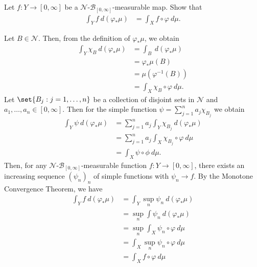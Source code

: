 \documentclass[10pt]{mypackage}
\begin{document}
\begin{problem}
  Let $f\colon Y\to [0,\infty]$ be a $\mathcal{N}$-$\mathcal{B}_{[0,\infty]}$-measurable map. Show that
  \begin{align*}
    \int_{Y}^{} f\:d\left( \varphi_{\ast}\mu \right) &= \int_{X}^{} f\circ\varphi\:d\mu.
  \end{align*}
\end{problem}
\begin{solution}
  Let $B\in \mathcal{N}$. Then, from the definition of $\varphi_{\ast}\mu$, we obtain  
  \begin{align*}
    \int_Y\chi_B\:d\left(\varphi_{\ast}\mu\right)&=\int_B\:d\left(\varphi_{\ast}\mu\right)\\
                                      &=\varphi_{\ast}\mu(B)\\
                                      &=\mu\left(\varphi^{-1}(B)\right)\\
                                      &=\int_X\chi_B\circ\varphi\:d\mu.
  \end{align*}
  Let $\set{B_j : j=1,\dots,n}$ be a collection of disjoint sets in $ \mathcal{N} $ and $a_1,\dots,a_n\in[0,\infty]$. Then for the simple function $\psi=\sum_{j=1}^na_j\chi_{B_j}$ we obtain
  \begin{align*}
    \int_Y\psi\:d\left(\varphi_{\ast}\mu\right)&=\sum_{j=1}^na_j\int_Y\chi_{B_j}\:d\left(\varphi_{\ast}\mu\right)\\
                                    &=\sum_{j=1}^na_j\int_X\chi_{B_j}\circ\varphi \:d\mu\\
                                    &=\int_X\psi\circ\phi\:d\mu.
  \end{align*}
  Then, for any $\mathcal{N}$-$\mathcal{B}_{[0,\infty]}$-measurable function $f\colon Y\rightarrow[0,\infty]$, there exists an increasing sequence $\left(\psi_n\right)_{n}$ of simple functions with $\psi_n\rightarrow f$. By the Monotone Convergence Theorem, we have 
  \begin{align*}
    \int_Y f\:d\left(\varphi_{\ast}\mu\right)&=\int_Y\sup_n\psi_n\:d\left(\varphi_{\ast}\mu\right)\\
                                  &=\sup_n\int\psi_n\:d\left(\varphi_{\ast}\mu\right)\\
                                  &=\sup_n\int_X\psi_n\circ\varphi \:d\mu\\
                                  &=\int_X\sup_n\psi_n\circ\varphi\:d\mu\\
                                  &=\int_Xf\circ\varphi\:d\mu
  \end{align*}
\end{solution}
\end{document}
